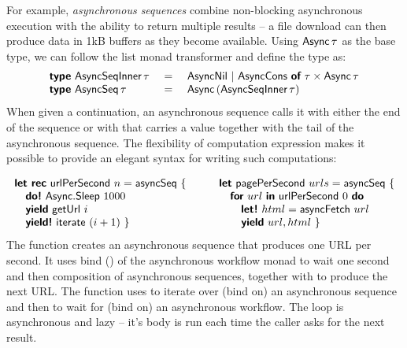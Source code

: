 \documentclass[runningheads,a4paper]{llncs}
\begin{document}
For example, \emph{asynchronous sequences} \cite{async-seq} combine non-blocking asynchronous 
execution with the ability to return multiple results -- a file download can then produce data 
in 1kB buffers as they become available. Using $\textnormal{\sffamily Async}\,\tau$ as the base type, we can
follow the list monad transformer \cite{list-trans} and define the type as:
%
\vspace{-0.20em}
\begin{equation*}
\begin{array}{lcl}
\kvd{type}~\ident{AsyncSeqInner}\,\tau &~=~& \ident{AsyncNil} ~|~
    \ident{AsyncCons}~\kvd{of}~\tau \times \ident{Async}\,\tau \\
\kvd{type}~\ident{AsyncSeq}\,\tau &=& \ident{Async}\,(\ident{AsyncSeqInner}\,\tau)
\end{array}
\vspace{-0.20em}
\end{equation*}
%
When given a continuation, an asynchronous sequence calls it with either the end of the 
sequence  or with  that carries a value together with
the tail of the asynchronous sequence. The flexibility of computation expression 
makes it possible to provide an elegant syntax for writing such computations:

\begin{equation*}
\begin{array}{l}
\kvd{let rec}~\ident{urlPerSecond}~n = \ident{asyncSeq}~\{ \\
\quad \kvd{do!}~\ident{Async}.\ident{Sleep}~1000 \\
\quad \kvd{yield}~\ident{getUrl}~i \\
\quad \kvd{yield!}~\ident{iterate}~(i+1) ~\}
\end{array}
\qquad
\begin{array}{l}
\kvd{let}~\ident{pagePerSecond}~urls = \ident{asyncSeq}~\{ \\
\quad \kvd{for}~url~\kvd{in}~\ident{urlPerSecond}~0~\kvd{do}\\
\quad\quad \kvd{let!}~html = \ident{asyncFetch}~url \\
\quad\quad \kvd{yield}~url, html ~\}
\end{array}
\end{equation*}
%
The  function creates an asynchronous sequence that produces one URL per
second. It uses bind () of the asynchronous workflow monad to wait one second
and then composition of asynchronous sequences, together with  to produce the 
next URL. The  function uses  to iterate over (bind on) an
asynchronous sequence and then  to wait for (bind on) an asynchronous workflow.
The  loop is asynchronous and lazy -- it's body is run each time the caller asks 
for the next result.
\end{document}
